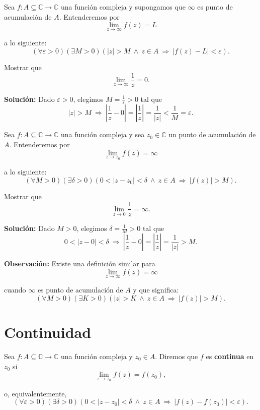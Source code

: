\begin{defi}
Sea $f: A \subseteq \mathbb{C} \longrightarrow \mathbb{C}$ una función compleja y supongamos que $\infty$ es punto de acumulación de $A$. Entenderemos por
$$\lim_{z \to \infty} f(z) = L$$

a lo siguiente:
$$(\forall \varepsilon >0)(\exists M >0)(|z|> M ~\wedge~ z \in A ~\Rightarrow~ |f(z) -L| < \varepsilon).$$
\end{defi}

\begin{ejemplo}
Mostrar que 
$$\lim_{z \to \infty} \frac{1}{z} = 0.$$

\textbf{Solución:} Dado $\varepsilon >0$,  elegimos $M = \frac{1}{\varepsilon} > 0$ tal que
$$|z| > M ~\Rightarrow~ \left| \frac{1}{z} -0 \right| = \left| \frac{1}{z} \right| = \frac{1}{|z|} < \frac{1}{M} = \varepsilon
.$$
\end{ejemplo}


\begin{defi}
Sea $f: A \subseteq \mathbb{C} \longrightarrow \mathbb{C}$ una función compleja y sea $z_0 \in \mathbb{C}$ un punto de acumulación de $A$. Entenderemos por
$$\lim_{z \to z_0} f(z) = \infty$$

a lo siguiente:
$$(\forall M >0)(\exists \delta >0)(0 < |z-z_0| < \delta ~\wedge~ z \in A ~\Rightarrow ~ |f(z)| >M).$$
\end{defi}

\begin{ejemplo}
Mostrar que 
$$\lim_{z \to 0} \frac{1}{z} = \infty.$$

\textbf{Solución:} Dado $M >0$,  elegimos $\delta = \frac{1}{M} > 0$ tal que
$$0 < |z-0| < \delta ~\Rightarrow~ \left| \frac{1}{z} -0 \right| = \left| \frac{1}{z} \right| = \frac{1}{|z|} > M
.$$
\end{ejemplo}

\textbf{Observación:} Existe una definición similar para
$$\lim_{z \to \infty} f(z) = \infty$$

cuando $\infty$ es punto de acumulación de $A$ y que significa:
$$(\forall M >0)(\exists K >0) (|z|> K ~\wedge~ z \in A ~\Rightarrow~ |f(z)| > M).$$

\section{Continuidad}

\begin{defi}
Sea $f: A \subseteq \mathbb{C} \rightarrow \mathbb{C}$ una función compleja y $z_0 \in A$. Diremos que $f$ es \textbf{continua} en $z_0$ si
$$\lim_{z \to z_0} f(z) = f(z_0),$$

o, equivalentemente, 
$$(\forall \varepsilon >0)(\exists \delta >0)(0 < |z-z_0| < \delta ~\wedge~ z \in A ~\Rightarrow~ |f(z) - f(z_0)| < \varepsilon).$$
\end{defi}

